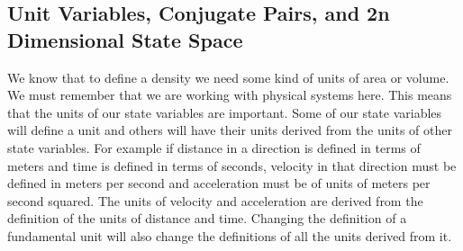 \documentclass{article}
\begin{document}
\subsection{Unit Variables, Conjugate Pairs, and 2n Dimensional State Space}

	We know that to define a density we need some kind of units of area or volume. We must remember that we are working with physical systems here. This means that the units of our state variables are important. Some of our state variables will define a unit and others will have their units derived from the units of other state variables. For example if distance in a direction is defined in terms of meters and time is defined in terms of seconds, velocity in that direction must be defined in meters per second and acceleration must be of units of meters per second squared. The units of velocity and acceleration are derived from the definition of the units of distance and time. Changing the definition of a fundamental unit will also change the definitions of all the units derived from it. 
	
\end{document}
